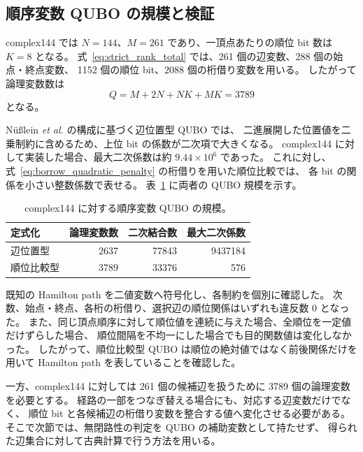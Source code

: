 \documentclass[a4j,10pt]{ujarticle}
\begin{document}
\subsection{順序変数 QUBO の規模と検証}

complex144 では $N=144$、$M=261$ であり、一頂点あたりの順位 bit 数は $K=8$ となる。
式~\eqref{eq:strict_rank_total} では、261 個の辺変数、288 個の始点・終点変数、
1152 個の順位 bit、2088 個の桁借り変数を用いる。
したがって論理変数数は
\begin{equation}
Q=M+2N+NK+MK=3789
\label{eq:strict_rank_variable_count}
\end{equation}
となる。

N{\"u}{\ss}lein \textit{et al.} の構成に基づく辺位置型 QUBO では、
二進展開した位置値を二乗制約に含めるため、上位 bit の係数が二次項で大きくなる。
complex144 に対して実装した場合、最大二次係数は約 $9.44\times10^6$ であった。
これに対し、式~\eqref{eq:borrow_quadratic_penalty} の桁借りを用いた順位比較では、
各 bit の関係を小さい整数係数で表せる。
表~\ref{tab:order_qubo_comparison} に両者の QUBO 規模を示す。

\begin{table}[htbp]
\centering
\caption{complex144 に対する順序変数 QUBO の規模。}
\label{tab:order_qubo_comparison}
\begin{tabular}{lrrr}
\hline
定式化 & 論理変数数 & 二次結合数 & 最大二次係数 \\
\hline
辺位置型 & 2637 & 77843 & 9437184 \\
順位比較型 & 3789 & 33376 & 576 \\
\hline
\end{tabular}
\end{table}

既知の Hamilton path を二値変数へ符号化し、各制約を個別に確認した。
次数、始点・終点、各桁の桁借り、選択辺の順位関係はいずれも違反数 0 となった。
また、同じ頂点順序に対して順位値を連続に与えた場合、全順位を一定値だけずらした場合、
順位間隔を不均一にした場合でも目的関数値は変化しなかった。
したがって、順位比較型 QUBO は順位の絶対値ではなく前後関係だけを用いて
Hamilton path を表していることを確認した。

一方、complex144 に対しては 261 個の候補辺を扱うために 3789 個の論理変数を必要とする。
経路の一部をつなぎ替える場合にも、対応する辺変数だけでなく、
順位 bit と各候補辺の桁借り変数を整合する値へ変化させる必要がある。
そこで次節では、無閉路性の判定を QUBO の補助変数として持たせず、
得られた辺集合に対して古典計算で行う方法を用いる。
\end{document}
